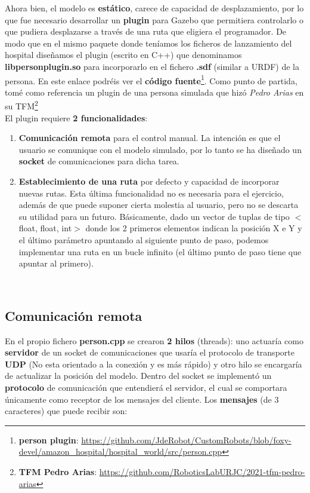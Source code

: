 Ahora bien, el modelo es \textbf{estático}, carece de capacidad de desplazamiento, por lo que fue necesario desarrollar un \textbf{plugin} para Gazebo que permitiera controlarlo o que pudiera desplazarse a través de una ruta que eligiera el programador. De modo que en el mismo paquete donde teníamos los ficheros de lanzamiento del hospital diseñamos el plugin (escrito en C++) que denominamos \textbf{libpersonplugin.so} para incorporarlo en el fichero \textbf{.sdf} (similar a URDF) de la persona. En este enlace podréis ver el \textbf{código fuente}\footnote{\textbf{person plugin}: \url{https://github.com/JdeRobot/CustomRobots/blob/foxy-devel/amazon_hospital/hospital_world/src/person.cpp}}. Como punto de partida, tomé como referencia un plugin de una persona simulada que hizó \textit{Pedro Arias} en su TFM\footnote{\textbf{TFM Pedro Arias}: \url{https://github.com/RoboticsLabURJC/2021-tfm-pedro-arias}}\\

El plugin requiere \textbf{2 funcionalidades}:
\begin{enumerate}
	\item \textbf{Comunicación remota} para el control manual. La intención es que el usuario se comunique con el modelo simulado, por lo tanto se ha diseñado un \textbf{socket} de comunicaciones para dicha tarea.
	\item \textbf{Establecimiento de una ruta} por defecto y capacidad de incorporar nuevas rutas. Esta última funcionalidad no es necesaria para el ejercicio, además de que puede suponer cierta molestia al usuario, pero no se descarta su utilidad para un futuro. Básicamente, dado un vector de tuplas de tipo $<$float, float, int$>$ donde los 2 primeros elementos indican la posición X e Y y el último parámetro apuntando al siguiente punto de paso, podemos implementar una ruta en un bucle infinito (el último punto de paso tiene que apuntar al primero).
\end{enumerate}\




\subsection{Comunicación remota}
\label{subsec:comunicacion_remota}

En el propio fichero \textbf{person.cpp} se crearon \textbf{2 hilos} (threads): uno actuaría como \textbf{servidor} de un socket de comunicaciones que usaría el protocolo de transporte \textbf{UDP} (No esta orientado a la conexión y es más rápido) y otro hilo se encargaría de actualizar la posición del modelo. Dentro del socket se implementó un \textbf{protocolo} de comunicación que entendierá el servidor, el cual se comportara únicamente como receptor de los mensajes del cliente. Los \textbf{mensajes} (de 3 caracteres) que puede recibir son:\\

